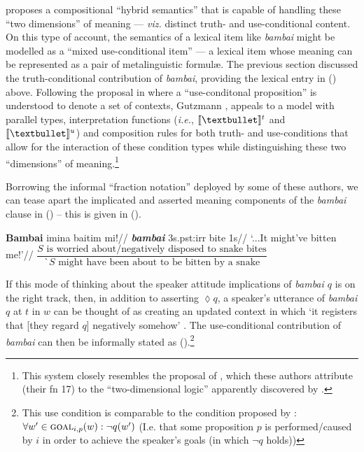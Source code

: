 \citet{Gutzmann2015} proposes a compositional ``hybrid semantics'' that is capable of handling these ``two dimensions'' of meaning --- \textit{viz.} distinct truth- and use-conditional content. On this type of account, the semantics of a lexical item like \textit{bambai} might be modelled as a ``mixed use-conditional item'' --- a lexical item whose meaning can be represented as a pair of metalinguistic formulæ.
The previous section discussed the truth-conditional contribution of \textit{bambai}, providing the lexical entry in () above. Following the proposal in \citet{Kaplan1999} where a ``use-conditonal proposition'' is understood to denote a set of contexts, Gutzmann \citeyearpar{Gutzmann2015}, appeals to a model with parallel types, interpretation functions (\textit{i.e.}, $ \denote[t]{•} $ and $ \denote[u]{•} $) and composition rules for both truth- and use-conditions that allow for the interaction of these condition types while distinguishing these two ``dimensions'' of meaning.\footnote{This system closely resembles the proposal of \citet{Karttunen1979}, which these authors attribute (their fn 17) to the ``two-dimensional logic'' apparently discovered by \citet{Herzberger1973}.}


 Borrowing the informal ``fraction notation'' deployed by some of these authors, we can tease apart the implicated and asserted meaning components of the \textit{bambai} clause in () -- this is given in (\nextx).%


\pex\a\begingl
\gla \textbf{Bambai} imina {baitim} mi!//
\glb \textsl{\textbf{bambai}} 3s.\gls{pst}:\gls{irr} bite 1s//
\glft`...It might've bitten me!'\trailingcitation{[GT~01052017]}//\endgl
\a$\dfrac{\mathit S\text{ is worried about/negatively disposed to snake bites}}{\mathit `S\text{ might have been about to be bitten by a snake}}$
\xe

If this mode of thinking about the speaker attitude implications of \textit{bambai $q$} is on the right track, then, in addition to asserting $ \lozenge q $, a speaker's utterance of \textit{bambai $ q $} at $ t $ in $ w $ can be thought of as creating an updated context in which `it registers that [they regard $q$] negatively somehow' \citep[175]{Potts2007}.
The use-conditional contribution of \textit{bambai} can then be informally stated as (\nextx).\footnote{This use condition is comparable to the condition proposed by \citet{AnderBois2020}: $ \forall w'\in\textsc{goal}_{i,p}(w):\neg q(w') $ (I.e. that some proposition $ p $ is performed/caused by $ i $ in order to achieve the speaker's goals (in which $ \neg q $ holds))}

